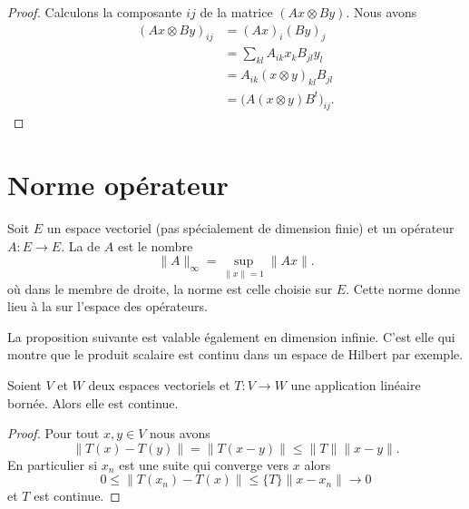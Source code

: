 \begin{proof}
    Calculons la composante \( ij\) de la matrice \( (Ax\otimes By)\). Nous avons
    \begin{subequations}
        \begin{align}
            (Ax\otimes By)_{ij}&=(Ax)_i(By)_j\\
            &=\sum_{kl}A_{ik}x_kB_{jl}y_l\\
            &=A_{ik}(x\otimes y)_{kl}B_{jl}\\
            &=\big( A(x\otimes y)B^t \big)_{ij}.
        \end{align}
    \end{subequations}
\end{proof}

\section{Norme opérateur}
\label{SeckwyQjK}

Soit \( E\) un espace vectoriel (pas spécialement de dimension finie) et un opérateur \( A\colon E\to E\). La  de \( A\) est le nombre
\begin{equation}    \label{EqThUCEJ}
    \| A \|_{\infty}=\sup_{\| x \|=1}\| Ax \|.
\end{equation}
où dans le membre de droite, la norme est celle choisie sur \( E\). Cette norme donne lieu à la  sur l'espace des opérateurs.

La proposition suivante est valable également en dimension infinie. C'est elle qui montre que le produit scalaire est continu dans un espace de Hilbert par exemple.
\begin{proposition}     \label{PropmEJjLE}
    Soient \( V\) et \( W\) deux espaces vectoriels et \( T\colon V\to W\) une application linéaire bornée. Alors elle est continue.
\end{proposition}

\begin{proof}
    Pour tout \( x,y\in V\) nous avons
    \begin{equation}
        \| T(x)-T(y) \|=\| T(x-y) \|\leq \| T \|\| x-y \|.
    \end{equation}
    En particulier si \( x_n\) est une suite qui converge vers \( x\) alors
    \begin{equation}
        0\leq \| T(x_n)-T(x) \|\leq \{ T \}\| x-x_n \|\to 0
    \end{equation}
    et \( T\) est continue.
\end{proof}

